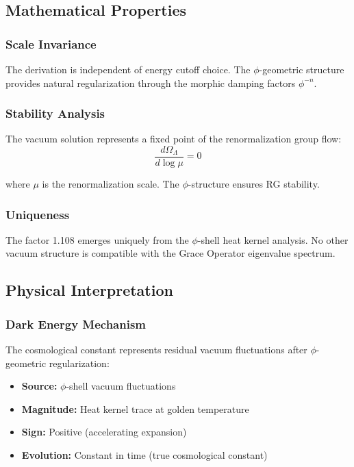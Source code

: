 \subsection{Mathematical Properties}

\subsubsection{Scale Invariance}

The derivation is independent of energy cutoff choice. The $\phi$-geometric structure provides natural regularization through the morphic damping factors $\phi^{-n}$.

\subsubsection{Stability Analysis}

The vacuum solution represents a fixed point of the renormalization group flow:
\begin{equation}
\frac{d\Omega_\Lambda}{d\log\mu} = 0
\end{equation}

where $\mu$ is the renormalization scale. The $\phi$-structure ensures RG stability.

\subsubsection{Uniqueness}

The factor 1.108 emerges uniquely from the $\phi$-shell heat kernel analysis. No other vacuum structure is compatible with the Grace Operator eigenvalue spectrum.

\subsection{Physical Interpretation}

\subsubsection{Dark Energy Mechanism}

The cosmological constant represents residual vacuum fluctuations after $\phi$-geometric regularization:
\begin{itemize}
\item \textbf{Source:} $\phi$-shell vacuum fluctuations
\item \textbf{Magnitude:} Heat kernel trace at golden temperature
\item \textbf{Sign:} Positive (accelerating expansion)
\item \textbf{Evolution:} Constant in time (true cosmological constant)
\end{itemize}

